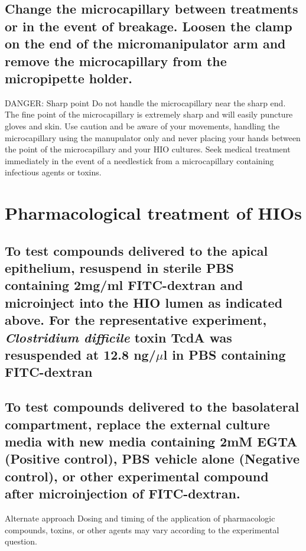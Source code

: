 \documentclass[11pt]{article}
\newcommand\dangersign[1][4ex]{\renewcommand\stacktype{L}\scaleto{\stackon[1pt]{\color{red}$\triangle$}{\tiny !}}{#1}}
\begin{document}
\subsection{{\sffamily } Change the microcapillary between treatments or in the event of breakage. Loosen the clamp on the end of the micromanipulator arm and remove the microcapillary from the micropipette holder.}
\label{sec:orgheadline56}
\begin{bclogo}[logo=\dangersign, couleurBarre=red, noborder=true, couleur=yellow!20]{     DANGER: Sharp point}
Do not handle the microcapillary near the sharp end. The fine point of the microcapillary is extremely sharp and will easily puncture gloves and skin. Use caution and be aware of your movements, handling the microcapillary using the manupulator only and never placing your hands between the point of the microcapillary and your HIO cultures. Seek medical treatment immediately in the event of a needlestick from a microcapillary containing infectious agents or toxins.\\
\end{bclogo}

\section{{\sffamily } Pharmacological treatment of HIOs}
\label{sec:orgheadline60}
\subsection{{\sffamily } To test compounds delivered to the apical epithelium, resuspend in sterile PBS containing 2mg/ml FITC-dextran and microinject into the HIO lumen as indicated above. For the representative experiment, \emph{Clostridium difficile} toxin TcdA was resuspended at 12.8 ng/\(\mu\)l in PBS containing FITC-dextran}
\label{sec:orgheadline58}
\subsection{{\sffamily } To test compounds delivered to the basolateral compartment, replace the external culture media with new media containing 2mM EGTA (Positive control), PBS vehicle alone (Negative control), or other experimental compound after microinjection of FITC-dextran.}
\label{sec:orgheadline59}
\begin{bclogo}[logo=\bcinfo, couleurBarre=Black, noborder=true, couleur=gray!10]{     Alternate approach}
Dosing and timing of the application of pharmacologic compounds, toxins, or other agents may vary according to the experimental question.\\
\end{bclogo}
\end{document}
